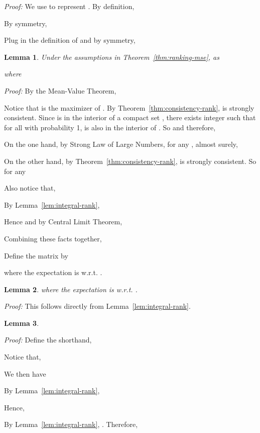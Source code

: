 \documentclass[11pt,a4paper]{article}
\newtheorem{lemma}{Lemma}[section]
\begin{document}
{\em Proof: }
We use  to represent . By definition, 

By symmetry, 

Plug in the definition of  and by symmetry, 




\begin{lemma}
  Under the assumptions in Theorem~\ref{thm:ranking-mse}, as 

where  

\label{lem:asym-rank}
\end{lemma}
{\em Proof:}
By the Mean-Value Theorem,

Notice that  is the maximizer of . By Theorem~\ref{thm:consistency-rank},  is strongly consistent. Since  is in the interior of a compact set , there exists integer  such that for all  with probability 1,  is also in the interior of . So  and therefore,

On the one hand, by Strong Law of Large Numbers, for any , almost surely,

On the other hand, by Theorem~\ref{thm:consistency-rank},  is strongly consistent. So for any 
 
Also notice that, 

By Lemma~\ref{lem:integral-rank}, 

Hence  and by Central Limit Theorem, 

Combining these facts together, 



Define the matrix  by 

where the expectation is w.r.t. . 

\begin{lemma}

where the expectation is w.r.t. .
\label{lem:W_k}
\end{lemma}

{\em Proof:}
This follows directly from Lemma~\ref{lem:integral-rank}. 



\begin{lemma} 
 
\label{lem:variance-rank}
\end{lemma}

{\em Proof:}
Define the shorthand, 

Notice that, 

We then have   

By Lemma~\ref{lem:integral-rank}, 


Hence,

By Lemma~\ref{lem:integral-rank}, . Therefore, 
\end{document}
